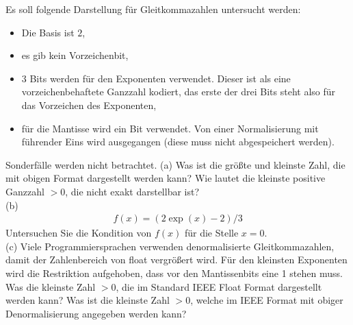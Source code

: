 \documentclass{scrartcl}
\begin{document}
Es soll folgende Darstellung für Gleitkommazahlen untersucht werden:
\begin{itemize}
	\item Die Basis ist $2$,
	\item es gib kein Vorzeichenbit,
	\item $3$ Bits werden für den Exponenten verwendet. Dieser ist als eine vorzeichenbehaftete Ganzzahl kodiert, das erste der drei Bits steht also für das Vorzeichen des Exponenten,
	\item für die Mantisse wird ein Bit verwendet. Von einer Normalisierung mit führender Eins wird ausgegangen (diese muss nicht abgespeichert werden).
\end{itemize}Sonderfälle werden nicht betrachtet.
\lbreak
\n
(a) 
Was ist die größte und kleinste Zahl, die mit obigen Format dargestellt werden kann?
\n 
Wie lautet die kleinste positive Ganzzahl $>0$, die nicht exakt darstellbar ist?
\lbreak \lbreak 
\\
(b) 
\begin{align*}
f(x) = (2\exp(x) - 2 ) / 3
\end{align*}
Untersuchen Sie die Kondition von $f(x)$ für die Stelle $x=0$.
\lbreak \lbreak 
\\
(c) 
Viele Programmiersprachen verwenden denormalisierte Gleitkommazahlen, damit der Zahlenbereich von float vergrößert wird. Für den kleinsten Exponenten wird die Restriktion aufgehoben, dass vor den Mantissenbits eine 1 stehen muss.
\n 
Was die kleinste Zahl $>0$, die im Standard IEEE Float Format dargestellt werden kann?
\n 
Was ist die kleinste Zahl $>0$, welche im IEEE Format mit obiger Denormalisierung angegeben werden kann?
\end{document}
